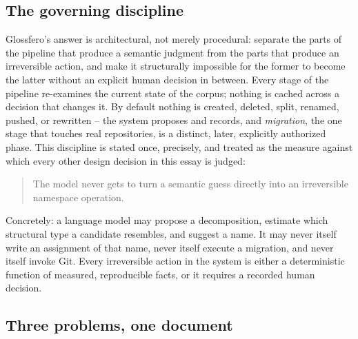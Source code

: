 \documentclass[11pt]{article}
\begin{document}
\subsection{The governing discipline}

Glossfero's answer is architectural, not merely procedural: separate the parts of the pipeline that produce a semantic judgment from the parts that produce an irreversible action, and make it structurally impossible for the former to become the latter without an explicit human decision in between. Every stage of the pipeline re-examines the current state of the corpus; nothing is cached across a decision that changes it. By default nothing is created, deleted, split, renamed, pushed, or rewritten -- the system proposes and records, and \emph{migration}, the one stage that touches real repositories, is a distinct, later, explicitly authorized phase. This discipline is stated once, precisely, and treated as the measure against which every other design decision in this essay is judged:

\begin{quote}
The model never gets to turn a semantic guess directly into an irreversible namespace operation.
\end{quote}

Concretely: a language model may propose a decomposition, estimate which structural type a candidate resembles, and suggest a name. It may never itself write an assignment of that name, never itself execute a migration, and never itself invoke Git. Every irreversible action in the system is either a deterministic function of measured, reproducible facts, or it requires a recorded human decision.

\subsection{Three problems, one document}
\end{document}

